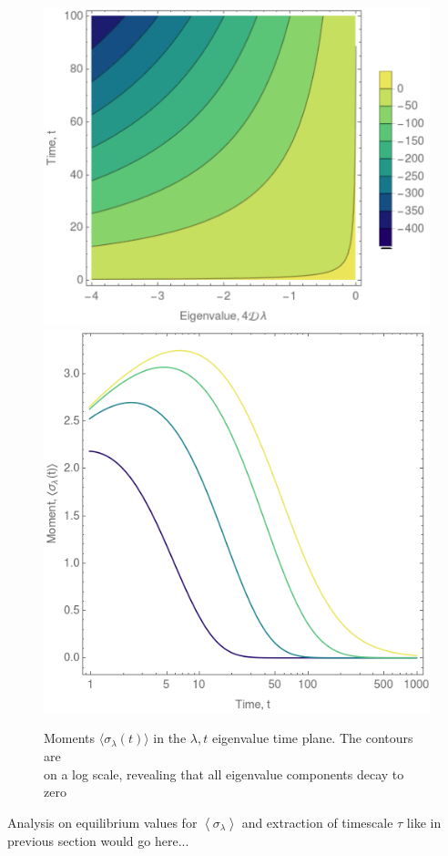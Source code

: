 \documentclass{article}[12pt]
\numberwithin{equation}{section}
\begin{document}
\begin{figure}[H]
\centering{}
\captionsetup{justification=centering}
\includegraphics[scale=0.4]{figures/ss1}
\includegraphics[scale=0.33]{figures/ss}
\caption{Moments $\langle \sigma_{\lambda}(t)\rangle$
in the $\lambda,t$ eigenvalue time plane. The contours are\\ on a log
scale, revealing that all eigenvalue components decay to zero}
\label{fig:ss}
\end{figure}
Analysis on equilibrium values for $\left\langle\sigma_\lambda\right\rangle$
and extraction of timescale $\tau$ like in previous section would go here...
\end{document}
